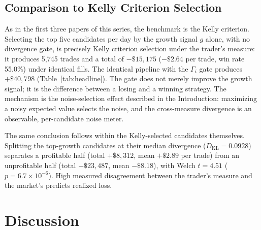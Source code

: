 \documentclass[11pt]{article}
\newcommand{\dkl}{D_{\mathrm{KL}}}
\begin{document}
\subsection{Comparison to Kelly Criterion Selection}
\label{sec:gate}

As in the first three papers of this series, the benchmark is the Kelly
criterion. Selecting the top five candidates per day by the growth signal $g$
alone, with no divergence gate, is precisely Kelly criterion selection under
the trader's measure: it produces 5{,}745 trades and a total of
$-\$15{,}175$ ($-\$2.64$ per trade, win rate 55.0\%) under identical fills.
The identical pipeline with the $\Gamma_i$ gate produces $+\$40{,}798$
(Table~\ref{tab:headline}). The gate does not merely improve the growth
signal; it is the difference between a losing and a winning strategy. The
mechanism is the noise-selection effect described in the Introduction:
maximizing a noisy expected value selects the noise, and the cross-measure
divergence is an observable, per-candidate noise meter.

The same conclusion follows within the Kelly-selected candidates themselves.
Splitting the top-growth candidates at their median divergence
($\dkl = 0.0928$) separates a profitable half (total $+\$8{,}312$, mean
$+\$2.89$ per trade) from an unprofitable half (total $-\$23{,}487$, mean
$-\$8.18$), with Welch $t = 4.51$ ($p = 6.7 \times 10^{-6}$). High measured
disagreement between the trader's measure and the market's predicts realized
loss.

\section{Discussion}
\label{sec:discussion}
\end{document}
